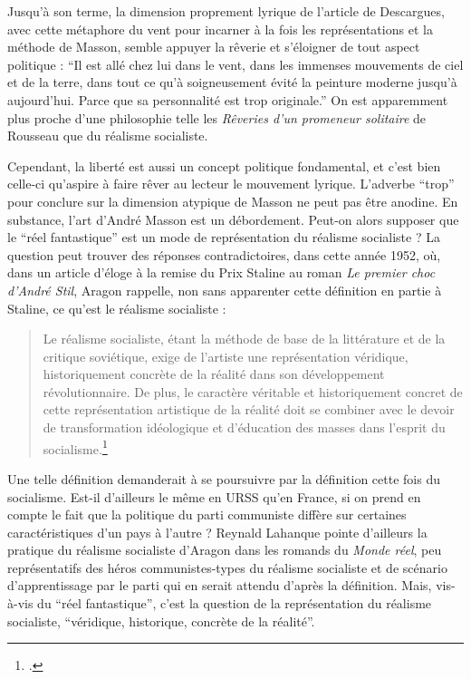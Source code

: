 Jusqu’à son terme, la dimension proprement lyrique de l’article de Descargues, avec cette métaphore du vent pour incarner à la fois les représentations et la méthode de Masson, semble appuyer la rêverie et s’éloigner de tout aspect politique : \enquote{Il est allé chez lui dans le vent, dans les immenses mouvements de ciel et de la terre, dans tout ce qu’à soigneusement évité la peinture moderne jusqu’à aujourd’hui. Parce que sa personnalité est trop originale.} On est apparemment plus proche d’une philosophie telle les \emph{Rêveries d’un promeneur solitaire} de Rousseau que du réalisme socialiste. 

	Cependant, la liberté est aussi un concept politique fondamental, et c’est bien celle-ci qu’aspire à faire rêver au lecteur le mouvement lyrique. L’adverbe \enquote{trop} pour conclure sur la dimension atypique de Masson ne peut pas être anodine. En substance, l’art d’André Masson est un débordement. Peut-on alors supposer que le \enquote{réel fantastique} est un mode de représentation du réalisme socialiste ? La question peut trouver des réponses contradictoires, dans cette année 1952, où, dans un article d’éloge à la remise du Prix Staline au roman \emph{Le premier choc d’André Stil}, Aragon rappelle, non sans apparenter cette définition en partie à Staline, ce qu’est le réalisme socialiste : 
	\begin{quote}
	Le réalisme socialiste, étant la méthode de base de la littérature et de la critique soviétique, exige de l’artiste une représentation véridique, historiquement concrète de la réalité dans son développement révolutionnaire. De plus, le caractère véritable et historiquement concret de cette représentation artistique de la réalité doit se combiner avec le devoir de transformation idéologique et d’éducation des masses dans l’esprit du socialisme.\footcite{}\end{quote}


	
	 Une telle définition demanderait à se poursuivre par la définition cette fois du socialisme. Est-il d’ailleurs le même en URSS qu’en France, si on prend en compte le fait que la politique du parti communiste diffère sur certaines caractéristiques d’un pays à l’autre ? Reynald Lahanque pointe d’ailleurs la pratique du réalisme socialiste d’Aragon dans les romands du \emph{Monde réel}, peu représentatifs des héros communistes-types du réalisme socialiste et de scénario d’apprentissage par le parti qui en serait attendu d’après la définition. Mais, vis-à-vis du \enquote{réel fantastique}, c’est la question de la représentation du réalisme socialiste, \enquote{véridique, historique, concrète de la réalité}.

